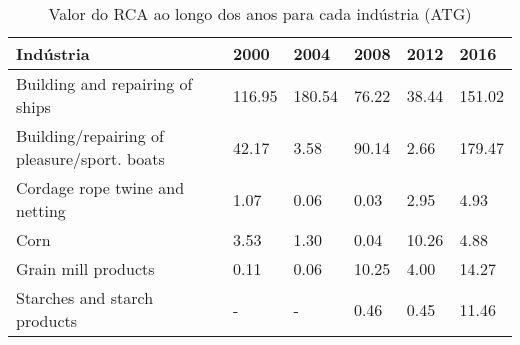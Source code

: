 \begin{table}
\centering
\caption{Valor do RCA ao longo dos anos para cada indústria (ATG)}
\label{tab:ex3-tempo-ATG}
\begin{tabular}{p{6cm}p{1.5cm}p{1.5cm}p{1.5cm}p{1.5cm}p{1.5cm}}
\toprule
                                  Indústria &   2000 &   2004 &  2008 &  2012 &   2016 \\
\midrule
            Building and repairing of ships & 116.95 & 180.54 & 76.22 & 38.44 & 151.02 \\
Building/repairing of pleasure/sport. boats &  42.17 &   3.58 & 90.14 &  2.66 & 179.47 \\
             Cordage rope twine and netting &   1.07 &   0.06 &  0.03 &  2.95 &   4.93 \\
                                       Corn &   3.53 &   1.30 &  0.04 & 10.26 &   4.88 \\
                        Grain mill products &   0.11 &   0.06 & 10.25 &  4.00 &  14.27 \\
               Starches and starch products &      - &      - &  0.46 &  0.45 &  11.46 \\
\bottomrule
\end{tabular}
\end{table}
